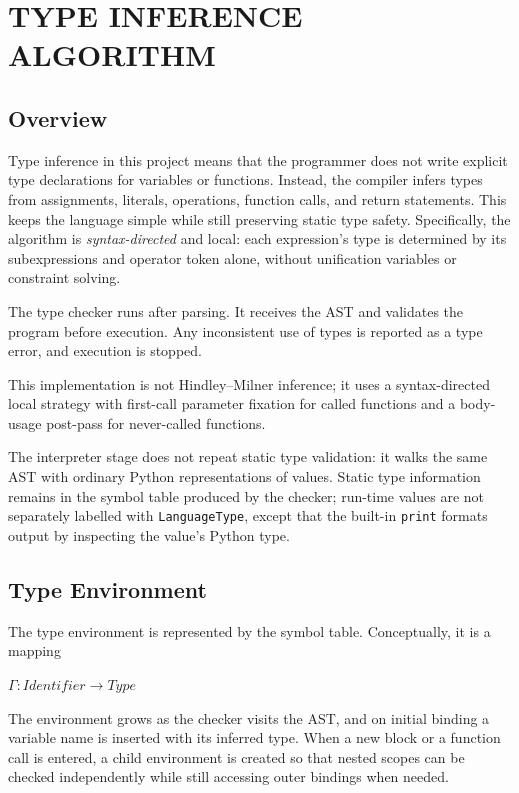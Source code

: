 \chapter{TYPE INFERENCE ALGORITHM}

\section{Overview}
Type inference in this project means that the programmer does not write explicit
type declarations for variables or functions. Instead, the compiler infers
types from assignments, literals, operations, function calls, and return
statements. This keeps the language simple while still preserving static type
safety. Specifically, the algorithm is \emph{syntax-directed} and local: each
expression's type is determined by its subexpressions and operator token alone,
without unification variables or constraint solving.

The type checker runs after parsing. It receives the AST and validates the
program before execution. Any inconsistent use of types is reported as a type
error, and execution is stopped.

This implementation is not Hindley--Milner inference; it uses a
syntax-directed local strategy with first-call parameter fixation for called
functions and a body-usage post-pass for never-called functions.

The interpreter stage does not repeat static type validation: it walks the same AST
with ordinary Python representations of values. Static type information remains
in the symbol table produced by the checker; run-time values are not separately
labelled with \texttt{LanguageType}, except that the built-in \texttt{print}
formats output
by inspecting the value's Python type.

\section{Type Environment}
The type environment is represented by the symbol table. Conceptually, it is a
mapping

\begin{center}
$\Gamma : \textit{Identifier} \rightarrow \textit{Type}$
\end{center}

The environment grows as the checker visits the AST, and on initial binding a
variable name is inserted with its inferred type. When a new block or a
function call is entered, a child environment is created so that nested scopes
can be checked independently while still accessing outer bindings when needed.

